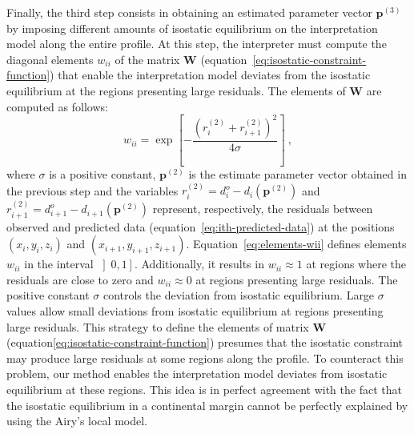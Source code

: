 \documentclass[manuscript]{geophysics}
\begin{document}
Finally, the third step consists in obtaining an estimated parameter vector $\mathbf{p}^{(3)}$
by imposing different amounts of isostatic equilibrium on the interpretation model along the
entire profile. At this step, the interpreter must compute the diagonal elements 
$w_{ii}$ of the matrix $\mathbf{W}$
(equation~\ref{eq:isostatic-constraint-function}) that enable the interpretation 
model deviates from the isostatic equilibrium at the regions presenting 
large residuals. The elements of $\mathbf{W}$ are computed as follows:
\begin{equation} \label{eq:elements-wii}
w_{ii} = 
\exp \left[ - \frac{ \left( r_{i}^{(2)} + r_{i+1}^{(2)} \right)^{2}}{4 \sigma} \right] \: ,
\end{equation}
where $\sigma$ is a positive constant, $\mathbf{p}^{(2)}$ is the estimate parameter vector
obtained in the previous step and the variables
$r_{i}^{(2)} = d^{o}_{i} - d_{i} \left( \mathbf{p}^{(2)} \right)$ and 
$r_{i+1}^{(2)} = d^{o}_{i+1} - d_{i+1} \left(\mathbf{p}^{(2)} \right)$ represent,
respectively, the residuals between observed and predicted data
(equation~\ref{eq:ith-predicted-data}) at the positions $(x_{i}, y_{i}, z_{i})$ and 
$(x_{i+1}, y_{i+1}, z_{i+1})$. Equation~\ref{eq:elements-wii} defines elements 
$w_{ii}$ in the interval $\left] 0, 1 \right]$. Additionally, it results in 
$w_{ii} \approx 1$ at regions where the residuals are close to zero and 
$w_{ii} \approx 0$ at regions presenting large residuals.
The positive constant $\sigma$ controls the deviation from isostatic equilibrium.
Large $\sigma$ values allow small deviations from isostatic equilibrium at
regions presenting large residuals.
This strategy to define the elements of matrix $\mathbf{W}$ 
(equation\ref{eq:isostatic-constraint-function}) presumes that the isostatic constraint may
produce large residuals at some regions along the profile. To counteract this problem,
our method enables the interpretation model deviates from isostatic equilibrium at these 
regions. This idea is in perfect agreement with the fact that the isostatic equilibrium
in a continental margin cannot be perfectly explained by using the Airy's local model.
\end{document}

